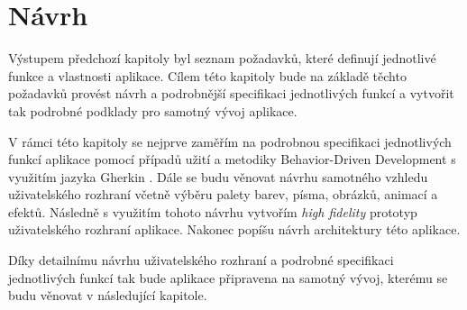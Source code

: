\chapter{Návrh}

Výstupem předchozí kapitoly byl seznam požadavků, které definují jednotlivé funkce a vlastnosti aplikace. Cílem této kapitoly bude na základě těchto požadavků provést návrh a podrobnější specifikaci jednotlivých funkcí a vytvořit tak podrobné podklady pro samotný vývoj aplikace.

V rámci této kapitoly se nejprve zaměřím na podrobnou specifikaci jednotlivých funkcí aplikace pomocí případů užití a metodiky Behavior-Driven Development \cite{BDD} s využitím jazyka Gherkin \cite{CucumberDocs}. Dále se budu věnovat návrhu samotného vzhledu uživatelského rozhraní včetně výběru palety barev, písma, obrázků, animací a efektů. Následně s využitím tohoto návrhu vytvořím \textit{high fidelity} prototyp uživatelského rozhraní aplikace. Nakonec popíšu návrh architektury této aplikace.

Díky detailnímu návrhu uživatelského rozhraní a podrobné specifikaci jednotlivých funkcí tak bude aplikace připravena na samotný vývoj, kterému se budu věnovat v následující kapitole.
